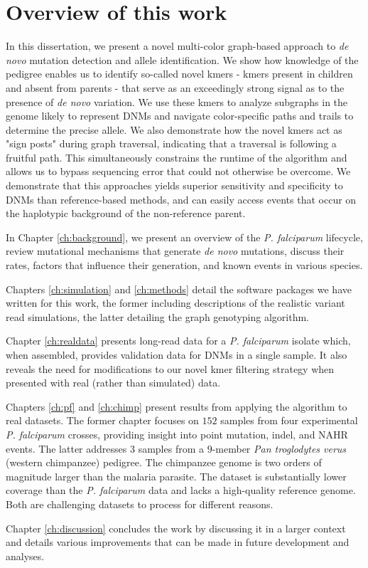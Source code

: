 \section{Overview of this work}

In this dissertation, we present a novel multi-color graph-based approach to \textit{de novo} mutation detection and allele identification.  We show how knowledge of the pedigree enables us to identify so-called novel kmers - kmers present in children and absent from parents - that serve as an exceedingly strong signal as to the presence of \textit{de novo} variation.  We use these kmers to analyze subgraphs in the genome likely to represent DNMs and navigate color-specific paths and trails to determine the precise allele.  We also demonstrate how the novel kmers act as "sign posts" during graph traversal, indicating that a traversal is following a fruitful path.  This simultaneously constrains the runtime of the algorithm and allows us to bypass sequencing error that could not otherwise be overcome.  We demonstrate that this approaches yields superior sensitivity and specificity to DNMs than reference-based methods, and can easily access events that occur on the haplotypic background of the non-reference parent.  

In Chapter \ref{ch:background}, we present an overview of the \textit{P. falciparum} lifecycle, review mutational mechanisms that generate \textit{de novo} mutations, discuss their rates, factors that influence their generation, and known events in various species.

Chapters \ref{ch:simulation} and \ref{ch:methods} detail the software packages we have written for this work, the former including descriptions of the realistic variant read simulations, the latter detailing the graph genotyping algorithm.

Chapter \ref{ch:realdata} presents long-read data for a \textit{P. falciparum} isolate which, when assembled, provides validation data for DNMs in a single sample.  It also reveals the need for modifications to our novel kmer filtering strategy when presented with real (rather than simulated) data.

Chapters \ref{ch:pf} and \ref{ch:chimp} present results from applying the algorithm to real datasets.  The former chapter focuses on $152$ samples from four experimental \textit{P. falciparum} crosses, providing insight into point mutation, indel, and NAHR events.  The latter addresses $3$ samples from a $9$-member \textit{Pan troglodytes verus} (western chimpanzee) pedigree.  The chimpanzee genome is two orders of magnitude larger than the malaria parasite.  The dataset is substantially lower coverage than the \textit{P. falciparum} data and lacks a high-quality reference genome.  Both are challenging datasets to process for different reasons.

Chapter \ref{ch:discussion} concludes the work by discussing it in a larger context and details various improvements that can be made in future development and analyses.
